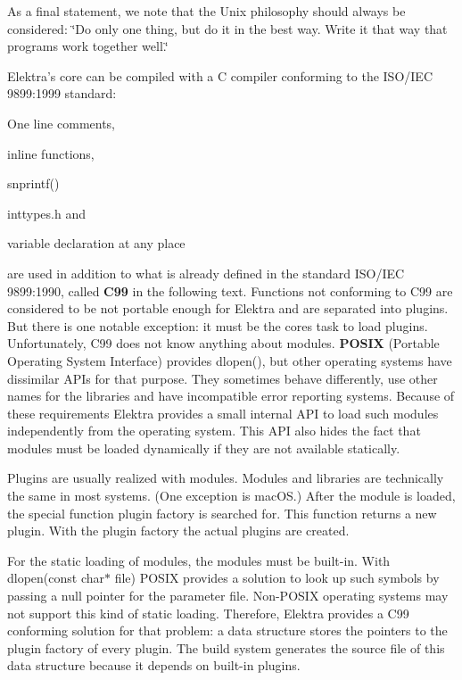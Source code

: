 As a final statement, we note that the Unix philosophy should always be considered\+: \char`\"{}\+Do only one thing, but do it in the best way. Write it
that way that programs work together well.\char`\"{}

Elektra’s core can be compiled with a C compiler conforming to the I\+S\+O/\+I\+EC 9899\+:1999 standard\+:


\begin{DoxyItemize}
\item One line comments,
\item inline functions,
\item {\ttfamily snprintf()}
\item inttypes.\+h and
\item variable declaration at any place
\end{DoxyItemize}

are used in addition to what is already defined in the standard I\+S\+O/\+I\+EC 9899\+:1990, called {\bfseries{C99}} in the following text. Functions not conforming to C99 are considered to be not portable enough for Elektra and are separated into plugins. But there is one notable exception\+: it must be the core\textquotesingle{}s task to load plugins. Unfortunately, C99 does not know anything about modules. {\bfseries{P\+O\+S\+IX}} (Portable Operating System Interface) provides {\ttfamily dlopen()}, but other operating systems have dissimilar A\+P\+Is for that purpose. They sometimes behave differently, use other names for the libraries and have incompatible error reporting systems. Because of these requirements Elektra provides a small internal A\+PI to load such modules independently from the operating system. This A\+PI also hides the fact that modules must be loaded dynamically if they are not available statically.

Plugins are usually realized with modules. Modules and libraries are technically the same in most systems. (One exception is mac\+OS.) After the module is loaded, the special function plugin factory is searched for. This function returns a new plugin. With the plugin factory the actual plugins are created.

For the static loading of modules, the modules must be built-\/in. With {\ttfamily dlopen(const char$\ast$ file)} P\+O\+S\+IX provides a solution to look up such symbols by passing a null pointer for the parameter {\ttfamily file}. Non-\/\+P\+O\+S\+IX operating systems may not support this kind of static loading. Therefore, Elektra provides a C99 conforming solution for that problem\+: a data structure stores the pointers to the plugin factory of every plugin. The build system generates the source file of this data structure because it depends on built-\/in plugins.

